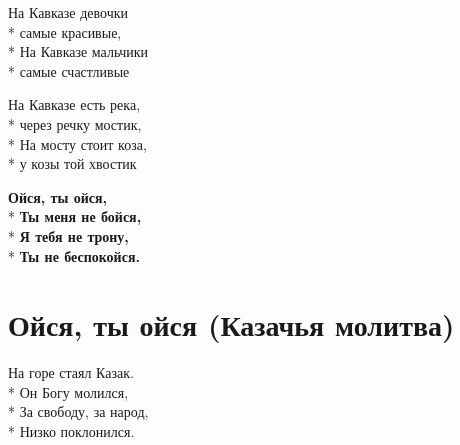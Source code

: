 \medskip

\begin{minipage}{\linewidth}
На Кавказе девочки\\*
самые красивые,\\*
На Кавказе мальчики\\*
самые счастливые\\
\end{minipage}\par\medskip\nobreak

\medskip

\begin{minipage}{\linewidth}
На Кавказе есть река,\\*
через речку мостик,\\*
На мосту стоит коза,\\*
у козы той хвостик\\
\end{minipage}\par\medskip\nobreak

\medskip

\begin{minipage}{\linewidth}
\hspace*{1.5em}\textbf{Ойся, ты ойся,}\\*
\hspace*{1.5em}\textbf{Ты меня не бойся,}\\*
\hspace*{1.5em}\textbf{Я тебя не трону,}\\*
\hspace*{1.5em}\textbf{Ты не беспокойся.}\\
\end{minipage}

\vspace{\fill}\newpage

\section{Ойся, ты ойся (Казачья молитва)}
\label{song:Ойся,_ты_ойся_(Казачья_молитва)}

\medskip

\begin{minipage}{\linewidth}
На горе стаял Казак.\\*
Он Богу молился,\\*
За свободу, за народ,\\*
Низко поклонился.\\
\end{minipage}\par\medskip\nobreak


